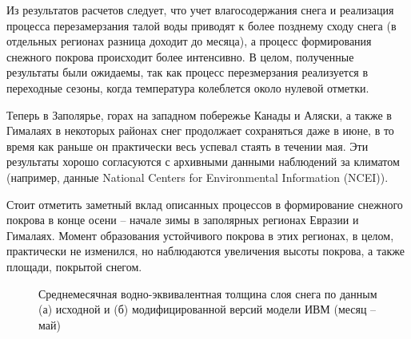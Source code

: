 \documentclass[a4paper, fontsize=14pt]{scrartcl}
\begin{document}
Из результатов расчетов следует, что учет влагосодержания снега и реализация процесса перезамерзания талой воды приводят к более позднему сходу снега (в отдельных регионах разница доходит до месяца), а процесс формирования снежного покрова происходит более интенсивно. В целом, полученные результаты были ожидаемы, так как процесс перезмерзания реализуется в переходные сезоны, когда температура колеблется около нулевой отметки.

Теперь в Заполярье, горах на западном побережье Канады и Аляски, а также в Гималаях в некоторых районах снег продолжает сохраняться даже в июне, в то время как раньше он практически весь успевал стаять в течении мая. Эти результаты хорошо согласуются с архивными данными наблюдений за климатом (например, данные National Centers for Environmental Information (NCEI)). 

Стоит отметить заметный вклад описанных процессов в формирование снежного покрова в конце осени -- начале зимы в заполярных регионах Евразии и Гималаях. Момент образования устойчивого покрова в этих регионах, в целом, практически не изменился, но наблюдаются увеличения высоты покрова, а также площади, покрытой снегом.

\begin{figure}[H]
    \begin{minipage}[h]{0.99\linewidth}
    \end{minipage}
    \begin{minipage}[h]{0.99\linewidth}
    \end{minipage}
    \caption{Среднемесячная водно-эквивалентная толщина слоя снега по данным (а) исходной и (б) модифицированной версий модели ИВМ (месяц -- май) }
    \label{fig:image}
\end{figure}
\end{document}
